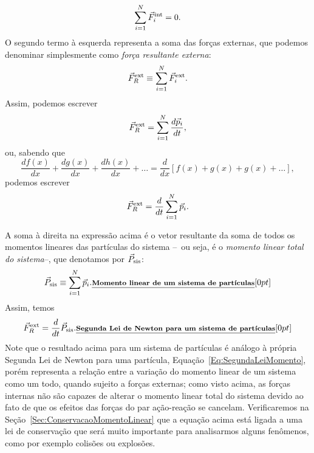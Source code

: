 \begin{equation}
    \sum_{i=1}^N \vec{F}_i^{\rm{int}} = 0.
\end{equation}
%
O segundo termo à esquerda representa a soma das forças externas, que podemos denominar simplesmente como \emph{força resultante externa}:
\begin{equation}
    \vec{F}_{R}^{\rm{ext}} \equiv \sum_{i=1}^N \vec{F}_i^{\rm{ext}}.
\end{equation}
%
Assim, podemos escrever
\begin{equation}
    \vec{F}_{R}^{\rm{ext}} = \sum_{i=1}^N \frac{d\vec{p}_i}{dt},
\end{equation}
%
ou, sabendo que
\begin{equation}
    \frac{df(x)}{dx} + \frac{dg(x)}{dx} + \frac{dh(x)}{dx} + \dots = \frac{d}{dx} [f(x) + g(x) + g(x) + \dots],
\end{equation}
%
podemos escrever
\begin{equation}
    \vec{F}_{R}^{\rm{ext}} = \frac{d}{dt}\sum_{i=1}^N \vec{p}_i.
\end{equation}

A soma à direita na expressão acima é o vetor resultante da soma de todos os momentos lineares das partículas do sistema --~ou seja, é o \emph{momento linear total do sistema}--, que denotamos por $\vec{P}_{\rm{sis}}$:
\begin{equation}\label{Eq:MomentoLinearSistemaDeParticulas}
    \vec{P}_{\rm{sis}} \equiv \sum_{i=1}^N \vec{p}_i. \relax{\footnotesize\emph{\textbf{Momento linear de um sistema de partículas}}}[0pt]
\end{equation}
%
Assim, temos
\begin{equation}\label{Eq:SegundaLeiSistemaDeParticulas}
    \vec{F}_{R}^{\rm{ext}} = \frac{d}{dt}\vec{P}_{\rm{sis}}. \relax{\footnotesize\emph{\textbf{Segunda Lei de Newton para um sistema de partículas}}}[0pt]
\end{equation}
%
Note que o resultado acima para um sistema de partículas é análogo à própria Segunda Lei de Newton para uma partícula, Equação~\eqref{Eq:SegundaLeiMomento}, porém representa a relação entre a variação do momento linear de um sistema como um todo, quando sujeito a forças externas; como visto acima, as forças internas não são capazes de alterar o momento linear total do sistema devido ao fato de que os efeitos das forças do par ação-reação se cancelam. Verificaremos na Seção~\ref{Sec:ConservacaoMomentoLinear} que a equação acima está ligada a uma lei de conservação que será muito importante para analisarmos alguns fenômenos, como por exemplo colisões ou explosões.

